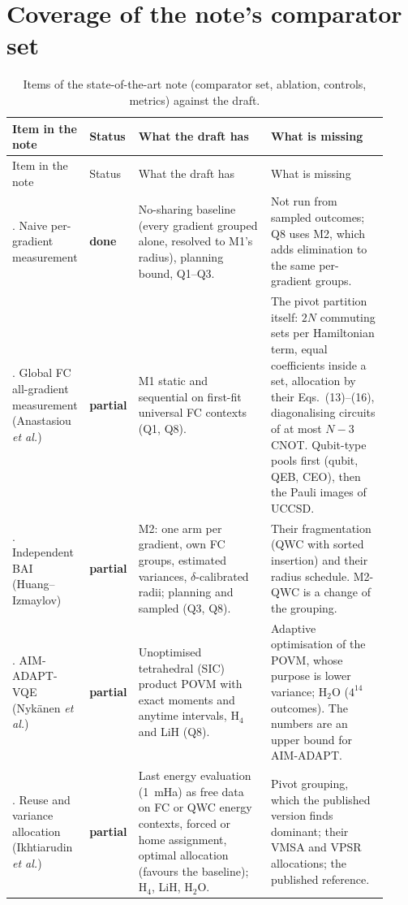 \documentclass[11pt]{article}
\newcommand{\stDone}{\textcolor{green!40!black}{\textbf{done}}}
\newcommand{\stPart}{\textcolor{orange!80!black}{\textbf{partial}}}
\newcommand{\Hfour}{H$_4$}
\newcommand{\Htwo}{H$_2$O}
\begin{document}
\section{Coverage of the note's comparator set}

\begingroup\small
\setlength{\tabcolsep}{4pt}
\begin{longtable}{>{\raggedright\arraybackslash}p{0.19\linewidth}>{\raggedright\arraybackslash}p{0.07\linewidth}>{\raggedright\arraybackslash}p{0.35\linewidth}>{\raggedright\arraybackslash}p{0.31\linewidth}}
\caption{Items of the state-of-the-art note (comparator set, ablation, controls, metrics) against the draft.\label{tab:cover}}\\
\toprule
Item in the note & Status & What the draft has & What is missing \\
\midrule
\endfirsthead
\toprule
Item in the note & Status & What the draft has & What is missing \\
\midrule
\endhead
1. Naive per-gradient measurement & \stDone & No-sharing baseline (every gradient grouped alone, resolved to M1's radius), planning bound, Q1--Q3. & Not run from sampled outcomes; Q8 uses M2, which adds elimination to the same per-gradient groups. \\
2. Global FC all-gradient measurement (Anastasiou \emph{et al.}) & \stPart & M1 static and sequential on first-fit universal FC contexts (Q1, Q8). & The pivot partition itself: $2N$ commuting sets per Hamiltonian term, equal coefficients inside a set, allocation by their Eqs.~(13)--(16), diagonalising circuits of at most $N-3$ CNOT. Qubit-type pools first (qubit, QEB, CEO), then the Pauli images of UCCSD. \\
3. Independent BAI (Huang--Izmaylov) & \stPart & M2: one arm per gradient, own FC groups, estimated variances, $\delta$-calibrated radii; planning and sampled (Q3, Q8). & Their fragmentation (QWC with sorted insertion) and their radius schedule. M2-QWC is a change of the grouping. \\
4. AIM-ADAPT-VQE (Nyk\"anen \emph{et al.}) & \stPart & Unoptimised tetrahedral (SIC) product POVM with exact moments and anytime intervals, \Hfour{} and LiH (Q8). & Adaptive optimisation of the POVM, whose purpose is lower variance; \Htwo{} ($4^{14}$ outcomes). The numbers are an upper bound for AIM-ADAPT. \\
5. Reuse and variance allocation (Ikhtiarudin \emph{et al.}) & \stPart & Last energy evaluation (1~mHa) as free data on FC or QWC energy contexts, forced or home assignment, optimal allocation (favours the baseline); \Hfour{}, LiH, \Htwo{}. & Pivot grouping, which the published version finds dominant; their VMSA and VPSR allocations; the published reference. \\

\end{longtable}
\end{document}
